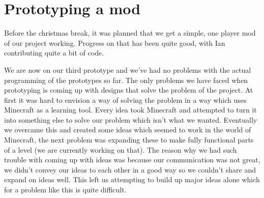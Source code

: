 \section{Prototyping a mod}
Before the christmas break, it was planned that we get a 
simple, one player mod of our project working. 
Progress on that has been quite good, with Ian contributing 
quite a bit of code.

We are now on our third prototype and we've had no problems with the actual programming of the prototypes so far. The only problems we have faced when prototyping is coming up with designs that solve the problem of the project. At first it was hard to envision a way of solving the problem in a way which uses Minecraft as a learning tool. Every idea took Minecraft and attempted to turn it into something else to solve our problem which isn't what we wanted. Eventually we overcame this and created some ideas which seemed to work in the world of Minecraft, the next problem was expanding these to make fully functional parts of a level (we are currently working on that). The reason why we had such trouble with coming up with ideas was because our communication was not great, we didn't convey our ideas to each other in a good way so we couldn't share and expand on ideas well. This left us attempting to build up major ideas alone which for a problem like this is quite difficult.
